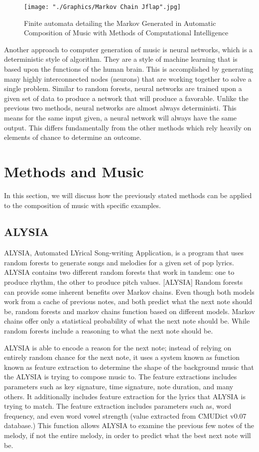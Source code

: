 \documentclass{sig-alternate}
\begin{document}
\begin{figure}[H]
	\texttt{[image: "./Graphics/Markov Chain Jflap".jpg]}
	\caption{Finite automata detailing the Markov Generated in Automatic Composition of Music with Methods of Computational Intelligence}
	\label{fig:markovchain1}
\end{figure}

	Another approach to computer generation of music is neural networks, which is a deterministic style of algorithm. They are a style of machine learning that is based upon the functions of the human brain. This is accomplished by generating many highly interconnected nodes (neurons) that are working together to solve a single problem. Similar to random forests, neural networks are trained upon a given set of data to produce a network that will produce a favorable. Unlike the previous two methods, neural networks are almost always deterministi. This means for the same input given, a neural network will always have the same output. This differs fundamentally from the other methods which rely heavily on elements of chance to determine an outcome.

\section{Methods and Music}
	In this section, we will discuss how the previously stated methods can be applied to the composition of music with specific examples.
\subsection{ALYSIA}
\label{sec:ALYSIA}
	ALYSIA, Automated LYrical Song-writing Application, is a program that uses random forests to generate songs and melodies for a given set of pop lyrics. ALYSIA contains two different random forests that work in tandem: one to produce rhythm, the other to produce pitch values. [ALYSIA] Random forests can provide some inherent benefits over Markov chains. Even though both models work from a cache of previous notes, and both predict what the next note should be, random forests and markov chains function based on different models. Markov chains offer only a statistical probability of what the next note should be. While random forests include a reasoning to what the next note should be.
	
	ALYSIA is able to encode a reason for the next note; instead of relying on entirely random chance for the next note, it uses a system known as function known as feature extraction to determine the shape of the background music that the ALYSIA is trying to compose music to. The feature extractions includes parameters such as key signature, time signature, note duration, and many others. It additionally includes feature extraction for the lyrics that ALYSIA is trying to match. The feature extraction includes parameters such as, word frequency, and even word vowel strength (value extracted from CMUDict v0.07 database.) This function allows ALYSIA to examine the previous few notes of the melody, if not the entire melody, in order to predict what the best next note will be.
\end{document}
